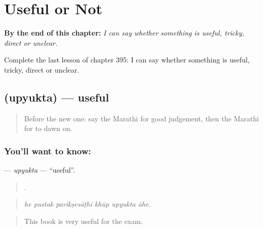 
\chapter{Useful or Not}
\label{ch:mr-useful-or-not}

\begin{chapteropening}
\textbf{By the end of this chapter:} \emph{I can say whether something is useful, tricky, direct or unclear.}

Complete the last lesson of chapter 395: I can say whether something is useful, tricky, direct or unclear.
\end{chapteropening}

\section[\texorpdfstring{\mr{उपयुक्त} (upyukta)}{उपयुक्त (upyukta)}]{ (upyukta) — useful}

\label{lesson:MR-C395-upyukta}



\begin{quote}
Before the new one: say the Marathi for good judgement, then the Marathi for to dawn on.
\end{quote}

\subsection*{You'll want to know: }
\textbf{} — \emph{upyukta} — \textquotedblleft{}useful\textquotedblright{}.

\begin{quote}
     .
\end{quote}

\begin{quote}
\emph{he pustak parīkṣesāṭhī khūp upyukta āhe.}
\end{quote}

\begin{quote}
This book is very useful for the exam.
\end{quote}

